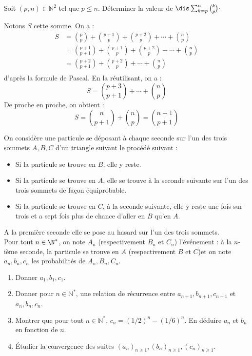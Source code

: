 \documentclass[a4paper,10pt]{report}
\begin{document}
\begin{Exa} Soit $(p, n) \in \mathbb{N}^2$ tel que $p \leq n$. Déterminer la valeur de $\dis\sum_{k=p}^n{k\choose p} \cdot$

\end{Exa}

\corr Notons $S$ cette somme. On a :
\begin{align*}
S & = \binom{p}{p} + \binom{p+1}{p} + \binom{p+2}{p} + \cdots + \binom{n}{p} \\
& = \binom{p+1}{p+1} + \binom{p+1}{p} + \binom{p+2}{p} + \cdots + \binom{n}{p} \\
& =  \binom{p+2}{p+1} + \binom{p+2}{p} + \cdots + \binom{n}{p} \\
\end{align*}
d'après la formule de Pascal. En la réutilisant, on a :
$$ S = \binom{p+3}{p+1} +  \cdots + \binom{n}{p} $$
De proche en proche, on obtient :
$$ S = \binom{n}{p+1}  + \binom{n}{p} = \binom{n+1}{p+1} $$

\begin{Exa} On considère une particule se déposant à chaque seconde sur l'un des trois sommets $A,B,C$ d'un triangle suivant le procédé suivant :

\vspace{0.3cm}

\begin{itemize}
 \item Si la particule se trouve en $B$, elle y reste.
 \item Si la particule se trouve en $A$, elle se trouve à la seconde suivante sur l'un des trois sommets de façon équiprobable.
 \item Si la particule se trouve en $C$, à la seconde suivante, elle y reste une fois sur trois et a sept fois plus de chance d'aller en $B$ qu'en $A$.
\end{itemize}

\vspace{0.3cm}

\noindent A la première seconde elle se pose au hasard sur l'un des trois sommets.\\
Pour tout $n\in \N^*$, on note $A_n$ (respectivement $B_n$ et $C_n$) l'événement : \og à la $n$-ième seconde, la particule se trouve en $A$ (respectivement $B$ et $C$)\fg et on note $a_n, b_n, c_n$ les probabilités de $A_n, B_n, C_n$.

\vspace{0.3cm}

\begin{enumerate}
 \item Donner $a_1, b_1, c_1$.
 \item Donner pour $n \in \mathbb{N}^*$, une relation de récurrence entre $a_{n+1}, b_{n+1}, c_{n+1}$ et $a_n, b_n, c_n$.
 \item Montrer que pour tout $n \in \mathbb{N}^*$, $c_n = (1/2)^n-(1/6)^n$. En déduire $a_n$ et $b_n$ en fonction de $n$.
 \item Étudier la convergence des suites $(a_n)_{n \geq 1}, (b_n)_{n \geq 1}, (c_n)_{n \geq 1}$.
\end{enumerate}
\end{Exa}
\end{document}
